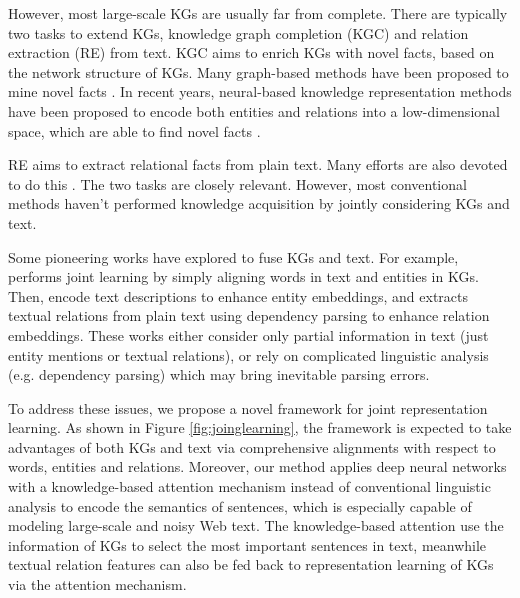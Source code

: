 \documentclass[11pt,a4paper]{article}
\begin{document}
However, most large-scale KGs are usually far from complete. There are typically two tasks to extend KGs, knowledge graph completion (KGC) and relation extraction (RE) from text. KGC aims to enrich KGs with novel facts, based on the network structure of KGs. Many graph-based methods have been proposed to mine novel facts \cite{lao2011random,lao2010relational}. In recent years, neural-based knowledge representation methods have been proposed to encode both entities and relations into a low-dimensional space, which are able to find novel facts \cite{bordes2013translating,wang2014transh,lin2015learning,ji2015knowledge,he2015learning,xiao2015transg,ji2016knowledge}. 

RE aims to extract relational facts from plain text. Many efforts are also devoted to do this \cite{surdeanu2012multi,riedel2013relation,min2013distant,zeng2014relation,zeng2015distant,lin2016neural,zeng2016incorporating}. The two tasks are closely relevant. However, most conventional methods haven't performed knowledge acquisition by jointly considering KGs and text.



Some pioneering works have explored to fuse KGs and text. For example,  performs joint learning by simply aligning words in text and entities in KGs. Then,  encode text descriptions to enhance entity embeddings, and  extracts textual relations from plain text using dependency parsing to enhance relation embeddings. These works either consider only partial information in text (just entity mentions or textual relations), or rely on complicated linguistic analysis (e.g. dependency parsing) which may bring inevitable parsing errors.

To address these issues, we propose a novel framework for joint representation learning. As shown in Figure \ref{fig:joinglearning}, the framework is expected to take advantages of both KGs and text via comprehensive alignments with respect to words, entities and relations. Moreover, our method applies deep neural networks with a knowledge-based attention mechanism instead of conventional linguistic analysis to encode the semantics of sentences, which is especially capable of modeling large-scale and noisy Web text. The knowledge-based attention use the information of KGs to select the most important sentences in text, meanwhile textual relation features can also be fed back to representation learning of KGs via the attention mechanism.
\end{document}
